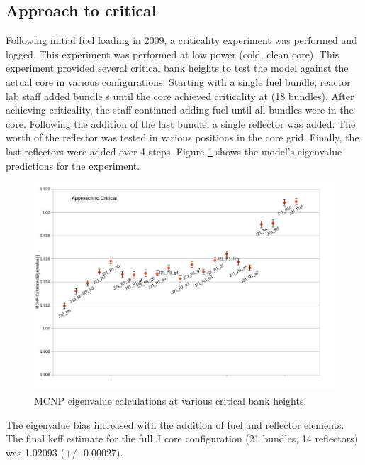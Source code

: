 \documentclass{UWNR_modeling}
\begin{document}
\subsection{Approach to critical}
Following initial fuel loading in 2009, a criticality experiment was performed and logged. This experiment was performed at low power (cold, clean core). This experiment provided several critical bank heights to test the model against the actual core in various configurations. Starting with a single fuel bundle, reactor lab staff added bundle
s until the core achieved criticality at (18 bundles). After achieving criticality, the staff continued adding fuel until all bundles were in the core. Following the addition of the last bundle, a single reflector was added. The worth of the reflector was tested in various positions in the core grid. Finally, the last reflectors were added over 4 steps.  Figure \ref{fig:atc} shows the model's eigenvalue predictions for the experiment.

\begin{figure}[t!]
  \centering
  \includegraphics[width=6in]{atc_run_1229.jpg}
  \caption{MCNP eigenvalue calculations at various critical bank heights.}
  \label{fig:atc}
\end{figure}

\noindent
The eigenvalue bias increased with the addition of fuel and reflector elements. The final keff estimate for the full J core configuration (21 bundles, 14 reflectors) was 1.02093 (+/- 0.00027).
\end{document}
